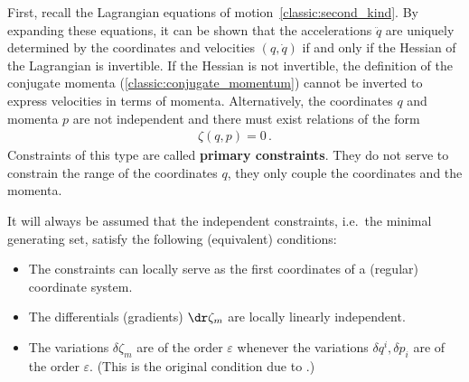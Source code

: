     First, recall the Lagrangian equations of motion~\eqref{classic:second_kind}. By expanding these equations, it can be shown that the accelerations $\ddot{q}$ are uniquely determined by the coordinates and velocities $(q,\dot{q})$ if and only if the Hessian of the Lagrangian is invertible. If the Hessian is not invertible, the definition of the conjugate momenta (\cref{classic:conjugate_momentum}) cannot be inverted to express velocities in terms of momenta. Alternatively, the coordinates $q$ and momenta $p$ are not independent and there must exist relations of the form
    \begin{gather}
        \zeta(q,p) = 0\,.
    \end{gather}
    Constraints of this type are called \textbf{primary constraints}. They do not serve to constrain the range of the coordinates $q$, they only couple the coordinates and the momenta.

    \begin{axiom}\label{constraint:regularity}
        It will always be assumed that the independent constraints, i.e.~the minimal generating set, satisfy the following (equivalent) conditions:
        \begin{itemize}
            \item The constraints can locally serve as the first coordinates of a (regular) coordinate system.
            \item The differentials (gradients) $\dr\zeta_m$ are locally linearly independent.
            \item The variations $\delta\zeta_m$ are of the order $\varepsilon$ whenever the variations $\delta q^i,\delta p_i$ are of the order $\varepsilon$. (This is the original condition due to .)
        \end{itemize}
    \end{axiom}

